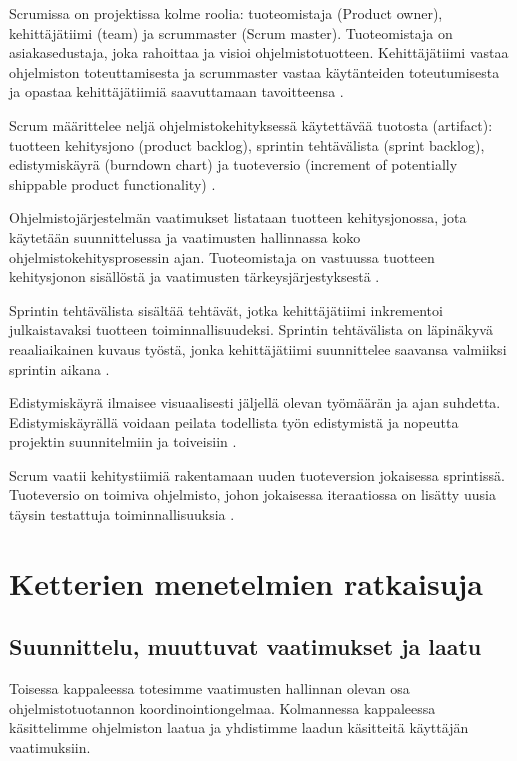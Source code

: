 \documentclass[finnish]{tktltiki2}
\theoremstyle{definition}
\theoremstyle{remark}
\begin{document}
Scrumissa on projektissa kolme roolia: tuoteomistaja (Product owner), kehittäjätiimi (team) ja scrummaster (Scrum master). Tuoteomistaja on asiakasedustaja, joka rahoittaa ja visioi ohjelmistotuotteen. Kehittäjätiimi vastaa ohjelmiston toteuttamisesta ja scrummaster vastaa käytänteiden toteutumisesta ja opastaa kehittäjätiimiä saavuttamaan tavoitteensa \cite{SCH09}.

Scrum määrittelee neljä ohjelmistokehityksessä käytettävää tuotosta (artifact): tuotteen kehitysjono (product backlog), sprintin tehtävälista (sprint backlog), edistymiskäyrä (burndown chart) ja tuoteversio (increment of potentially shippable product functionality) \cite{SCH09}. 

Ohjelmistojärjestelmän vaatimukset listataan tuotteen kehitysjonossa, jota käytetään suunnittelussa ja vaatimusten hallinnassa koko ohjelmistokehitysprosessin ajan. Tuoteomistaja on vastuussa tuotteen kehitysjonon sisällöstä ja vaatimusten tärkeysjärjestyksestä \cite{SCH09}.

Sprintin tehtävälista sisältää tehtävät, jotka kehittäjätiimi inkrementoi julkaistavaksi tuotteen toiminnallisuudeksi. Sprintin tehtävälista on läpinäkyvä reaaliaikainen kuvaus työstä, jonka kehittäjätiimi suunnittelee saavansa valmiiksi sprintin aikana \cite{SCH09}.

Edistymiskäyrä ilmaisee visuaalisesti jäljellä olevan työmäärän ja ajan suhdetta. Edistymiskäyrällä voidaan peilata todellista työn edistymistä ja nopeutta projektin suunnitelmiin ja toiveisiin \cite{SCH09}.

Scrum vaatii kehitystiimiä rakentamaan uuden tuoteversion jokaisessa sprintissä. Tuoteversio on toimiva ohjelmisto, johon jokaisessa iteraatiossa on lisätty uusia täysin testattuja toiminnallisuuksia \cite{SCH09}.

\section{Ketterien menetelmien ratkaisuja}

\subsection{Suunnittelu, muuttuvat vaatimukset ja laatu}

Toisessa kappaleessa totesimme vaatimusten hallinnan olevan osa ohjelmistotuotannon koordinointiongelmaa. Kolmannessa kappaleessa käsittelimme ohjelmiston laatua ja yhdistimme laadun käsitteitä käyttäjän vaatimuksiin. 
\end{document}
